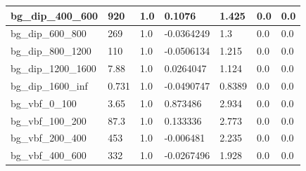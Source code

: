 \documentclass[a4paper, 10pt]{article}
\begin{document}
\begin{table}[H]
\begin{center}
\begin{tabular}{|m{23.0mm}|m{23.0mm}|m{18.0mm}|m{19.0mm}|m{19.0mm}|m{19.0mm}|m{19.0mm}|}
      \hline
      {\cellcolor{white}         bg\_dip\_400\_600}& {\cellcolor{white}         920}& {\cellcolor{white}         1.0}& {\cellcolor{white}         0.1076}& {\cellcolor{white}         1.425}& {\cellcolor{green}         0.0}& {\cellcolor{green}         0.0}\\
      \hline
      {\cellcolor{white}         bg\_dip\_600\_800}& {\cellcolor{white}         269}& {\cellcolor{white}         1.0}& {\cellcolor{white}         -0.0364249}& {\cellcolor{white}         1.3}& {\cellcolor{green}         0.0}& {\cellcolor{green}         0.0}\\
      \hline
      {\cellcolor{white}         bg\_dip\_800\_1200}& {\cellcolor{white}         110}& {\cellcolor{white}         1.0}& {\cellcolor{white}         -0.0506134}& {\cellcolor{white}         1.215}& {\cellcolor{green}         0.0}& {\cellcolor{green}         0.0}\\
      \hline
      {\cellcolor{white}         bg\_dip\_1200\_1600}& {\cellcolor{white}         7.88}& {\cellcolor{white}         1.0}& {\cellcolor{white}         0.0264047}& {\cellcolor{white}         1.124}& {\cellcolor{green}         0.0}& {\cellcolor{green}         0.0}\\
      \hline
      {\cellcolor{white}         bg\_dip\_1600\_inf}& {\cellcolor{white}         0.731}& {\cellcolor{white}         1.0}& {\cellcolor{white}         -0.0490747}& {\cellcolor{white}         0.8389}& {\cellcolor{green}         0.0}& {\cellcolor{green}         0.0}\\
      \hline
      {\cellcolor{white}         bg\_vbf\_0\_100}& {\cellcolor{white}         3.65}& {\cellcolor{white}         1.0}& {\cellcolor{white}         0.873486}& {\cellcolor{white}         2.934}& {\cellcolor{green}         0.0}& {\cellcolor{green}         0.0}\\
      \hline
      {\cellcolor{white}         bg\_vbf\_100\_200}& {\cellcolor{white}         87.3}& {\cellcolor{white}         1.0}& {\cellcolor{white}         0.133336}& {\cellcolor{white}         2.773}& {\cellcolor{green}         0.0}& {\cellcolor{green}         0.0}\\
      \hline
      {\cellcolor{white}         bg\_vbf\_200\_400}& {\cellcolor{white}         453}& {\cellcolor{white}         1.0}& {\cellcolor{white}         -0.006481}& {\cellcolor{white}         2.235}& {\cellcolor{green}         0.0}& {\cellcolor{green}         0.0}\\
      \hline
      {\cellcolor{white}         bg\_vbf\_400\_600}& {\cellcolor{white}         332}& {\cellcolor{white}         1.0}& {\cellcolor{white}         -0.0267496}& {\cellcolor{white}         1.928}& {\cellcolor{green}         0.0}& {\cellcolor{green}         0.0}\\

\end{tabular}
\end{center}
\end{table}
\end{document}

